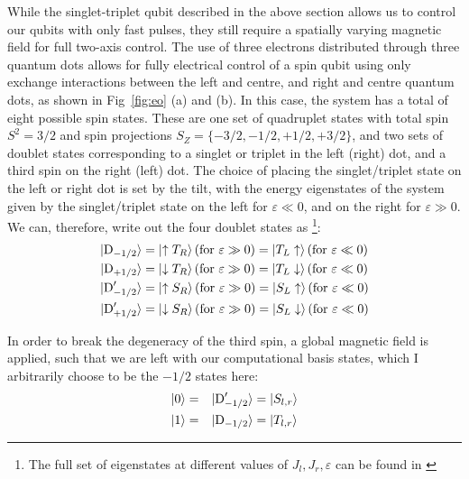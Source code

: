 While the singlet-triplet qubit described in the above section allows us to control our qubits with only fast pulses, they still require
a spatially varying magnetic field for full two-axis control. The use of three electrons distributed through three quantum dots allows
for fully electrical control of a spin qubit using only exchange interactions between the left and centre, and right and centre quantum
dots\cite{10.1038-35042541}, as shown in Fig~\ref{fig:eo} (a) and (b). In this case, the system has a total of eight possible spin states. These
are one set of quadruplet states with total spin $S^2 = 3/2$ and spin projections $S_Z = \{-3/2, -1/2, +1/2, +3/2\}$, and two sets of doublet
states corresponding to a singlet or triplet in the left (right) dot, and a third spin on the right (left) dot. The choice of placing the singlet/triplet
state on the left or right dot is set by the tilt, with the energy eigenstates of the system given by the singlet/triplet state on the left for $\varepsilon \ll 0$,
and on the right for $\varepsilon \gg 0$. We can, therefore, write out the four doublet states as
\footnote{The full set of eigenstates at different values of $J_l, J_r, \varepsilon$ can be found in \cite{PhysRevB.82.075403}}:
\begin{equation}
\begin{split}
  \ket{\textrm{D}_{-1/2}}        &= \ket{\uparrow T_R}   (\textrm{for }\varepsilon \gg 0) = \ket{T_L\uparrow}   (\textrm{for }\varepsilon \ll 0)\\
  \ket{\textrm{D}_{+1/2}}        &= \ket{\downarrow T_R} (\textrm{for }\varepsilon \gg 0) = \ket{T_L\downarrow} (\textrm{for }\varepsilon \ll 0)\\
  \ket{\textrm{D}^\prime_{-1/2}} &= \ket{\uparrow S_R}   (\textrm{for }\varepsilon \gg 0) = \ket{S_L\uparrow}   (\textrm{for }\varepsilon \ll 0)\\
  \ket{\textrm{D}^\prime_{+1/2}} &= \ket{\downarrow S_R} (\textrm{for }\varepsilon \gg 0) = \ket{S_L\downarrow} (\textrm{for }\varepsilon \ll 0)\\
\end{split}
\end{equation}

In order to break the degeneracy of the third spin, a global magnetic field is applied, such that we are left with our computational basis states, which
I arbitrarily choose to be the $-1/2$ states here:
\begin{alignat}{2}
  \ket{0} &=& \ket{\textrm{D}^\prime_{-1/2}} &= \ket{S_{l,r}} \\
  \ket{1} &=& \ket{\textrm{D}_{-1/2}} &= \ket{T_{l,r}}
\end{alignat}

